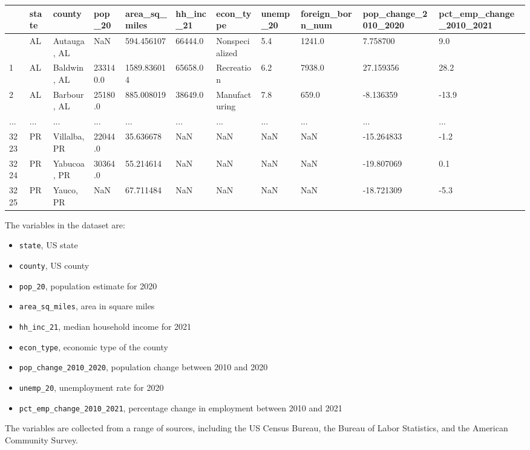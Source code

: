 \documentclass[
  letterpaper,
  DIV=11,
  numbers=noendperiod]{scrreprt}
\providecommand{\tightlist}{%
  \setlength{\itemsep}{0pt}\setlength{\parskip}{0pt}}\usepackage{longtable,booktabs,array}
\begin{document}
\begin{longtable}[]{@{}lllllllllll@{}}
\toprule\noalign{}
& state & county & pop\_20 & area\_sq\_miles & hh\_inc\_21 & econ\_type
& unemp\_20 & foreign\_born\_num & pop\_change\_2010\_2020 &
pct\_emp\_change\_2010\_2021 \\
\midrule\noalign{}
\endhead
\bottomrule\noalign{}
\endlastfoot
0 & AL & Autauga, AL & NaN & 594.456107 & 66444.0 & Nonspecialized & 5.4
& 1241.0 & 7.758700 & 9.0 \\
1 & AL & Baldwin, AL & 233140.0 & 1589.836014 & 65658.0 & Recreation &
6.2 & 7938.0 & 27.159356 & 28.2 \\
2 & AL & Barbour, AL & 25180.0 & 885.008019 & 38649.0 & Manufacturing &
7.8 & 659.0 & -8.136359 & -13.9 \\
... & ... & ... & ... & ... & ... & ... & ... & ... & ... & ... \\
3223 & PR & Villalba, PR & 22044.0 & 35.636678 & NaN & NaN & NaN & NaN &
-15.264833 & -1.2 \\
3224 & PR & Yabucoa, PR & 30364.0 & 55.214614 & NaN & NaN & NaN & NaN &
-19.807069 & 0.1 \\
3225 & PR & Yauco, PR & NaN & 67.711484 & NaN & NaN & NaN & NaN &
-18.721309 & -5.3 \\
\end{longtable}

The variables in the dataset are:

\begin{itemize}
\tightlist
\item
  \texttt{state}, US state
\item
  \texttt{county}, US county
\item
  \texttt{pop\_20}, population estimate for 2020
\item
  \texttt{area\_sq\_miles}, area in square miles
\item
  \texttt{hh\_inc\_21}, median household income for 2021
\item
  \texttt{econ\_type}, economic type of the county
\item
  \texttt{pop\_change\_2010\_2020}, population change between 2010 and
  2020
\item
  \texttt{unemp\_20}, unemployment rate for 2020
\item
  \texttt{pct\_emp\_change\_2010\_2021}, percentage change in employment
  between 2010 and 2021
\end{itemize}

The variables are collected from a range of sources, including the US
Census Bureau, the Bureau of Labor Statistics, and the American
Community Survey.
\end{document}

